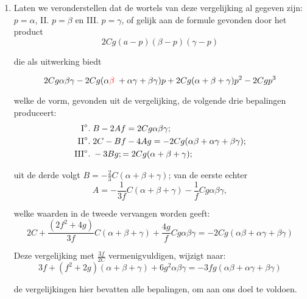 \documentclass[10pt,a4paper]{article}
\newcommand{\switchenum}{\setcounter{enumi}{\arabic{enumi}-1}\switchcolumn}
\begin{document}
\begin{paracol}{2}
\begin{enumerate}[topsep=1px]
		\switchenum
		\item Laten we veronderstellen dat de wortels van deze vergelijking al gegeven zijn: $p=\alpha$, II\degree. $p=\beta$ en III\degree. $p=\gamma$, of gelijk aan de formule gevonden door het product
		\[
			2Cg(a-p)(\beta-p)(\gamma-p)
		\]
		
		\newpage
		
		\par die als uitwerking biedt
		
		\[
			2Cg\alpha \beta \gamma - 2Cg(\alpha {\color{red}\beta\;}+\alpha \gamma+\beta \gamma)p+2Cg(\alpha+\beta+\gamma)p^2 - 2Cgp^3
		\]
		\par welke de vorm, gevonden uit de vergelijking, de volgende drie bepalingen produceert:
		\begin{align*}
			\text{I}\degree. \;& B-2Af = 2Cg\alpha\beta\gamma;\\
			\text{II}\degree. \; & 2C-Bf-4Ag = -2Cg(\alpha \beta +\alpha \gamma+\beta \gamma);\\
			\text{III}\degree. \; & -3Bg; = 2Cg(\alpha+\beta+\gamma);
		\end{align*}
		\par uit de derde volgt $B=-\frac{2}{3}C(\alpha+\beta+\gamma)$; van de eerste echter
		\[
			A = -\frac{1}{3f}C(\alpha+\beta+\gamma)-\frac{1}{f}Cg\alpha \beta \gamma,
		\]
		\par welke waarden in de tweede vervangen worden geeft:
		\[
			2C+\frac{(2f^2+4g)}{3f}C(\alpha+ \beta + \gamma)+\frac{4g}{f}Cg\alpha \beta \gamma  = -2Cg(\alpha \beta + \alpha \gamma+\beta \gamma)
		\]
		\par Deze vergelijking met $\frac{3f}{2C}$ vermenigvuldigen, wijzigt naar:
		\[
			3f+(f^2+2g)(\alpha+\beta+\gamma)+6g^2\alpha  \beta \gamma = -3fg(\alpha \beta + \alpha \gamma + \beta \gamma)
		\]
		\par de vergelijkingen hier bevatten alle bepalingen, om aan ons doel te voldoen.		
		
		\switchcolumn*
		

\end{enumerate}
\end{paracol}
\end{document}
